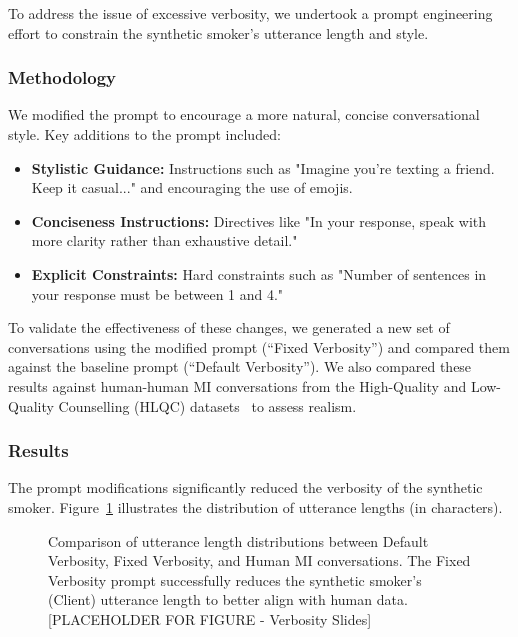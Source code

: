 To address the issue of excessive verbosity, we undertook a prompt engineering effort to constrain the synthetic smoker's utterance length and style.

\subsubsection{Methodology}
We modified the prompt to encourage a more natural, concise conversational style. Key additions to the prompt included:

\begin{itemize}
    \item \textbf{Stylistic Guidance:} Instructions such as "Imagine you're texting a friend. Keep it casual..." and encouraging the use of emojis.
    \item \textbf{Conciseness Instructions:} Directives like "In your response, speak with more clarity rather than exhaustive detail."
    \item \textbf{Explicit Constraints:} Hard constraints such as "Number of sentences in your response must be between 1 and 4."
\end{itemize}

To validate the effectiveness of these changes, we generated a new set of conversations using the modified prompt (``Fixed Verbosity'') and compared them against the baseline prompt (``Default Verbosity''). We also compared these results against human-human MI conversations from the High-Quality and Low-Quality Counselling (HLQC) datasets~\citep{perez2019what} to assess realism.

\subsubsection{Results}

The prompt modifications significantly reduced the verbosity of the synthetic smoker. Figure~\ref{fig:verbosity-comparison} illustrates the distribution of utterance lengths (in characters).

\begin{figure}[ht]
    \centering
    \caption{Comparison of utterance length distributions between Default Verbosity, Fixed Verbosity, and Human MI conversations. The Fixed Verbosity prompt successfully reduces the synthetic smoker's (Client) utterance length to better align with human data. [PLACEHOLDER FOR FIGURE - Verbosity Slides]}
    \label{fig:verbosity-comparison}
\end{figure}

